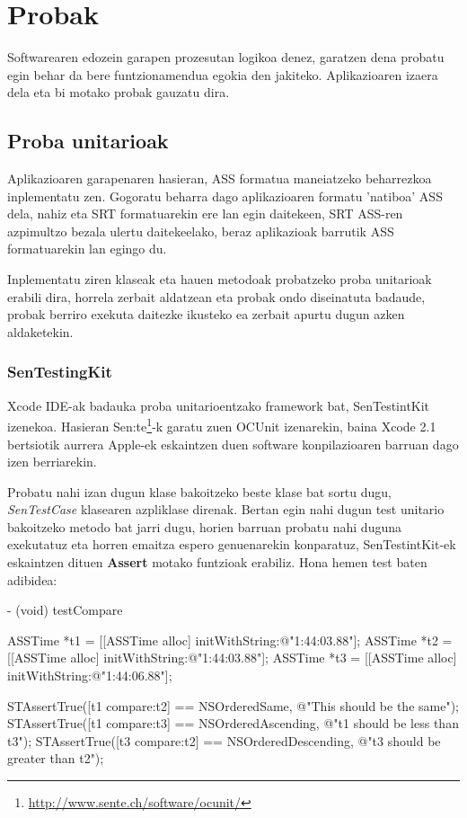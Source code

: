 \section{Probak}
Softwarearen edozein garapen prozesutan logikoa denez, garatzen dena probatu egin behar da bere funtzionamendua egokia den jakiteko. Aplikazioaren izaera dela eta bi motako probak gauzatu dira.

\subsection{Proba unitarioak}
Aplikazioaren garapenaren hasieran, ASS formatua maneiatzeko beharrezkoa inplementatu zen. Gogoratu beharra dago aplikazioaren formatu 'natiboa' ASS dela, nahiz eta SRT formatuarekin ere lan egin daitekeen, SRT ASS-ren azpimultzo bezala ulertu daitekeelako, beraz aplikazioak barrutik ASS formatuarekin lan egingo du.

Inplementatu ziren klaseak eta hauen metodoak probatzeko proba unitarioak erabili dira, horrela zerbait aldatzean eta probak ondo diseinatuta badaude, probak berriro exekuta daitezke ikusteko ea zerbait apurtu dugun azken aldaketekin.

\subsubsection{SenTestingKit}
Xcode IDE-ak badauka proba unitarioentzako framework bat, SenTestintKit izenekoa. Hasieran Sen:te\footnote{\url{http://www.sente.ch/software/ocunit/}}-k garatu zuen OCUnit izenarekin, baina Xcode 2.1 bertsiotik aurrera Apple-ek eskaintzen duen software konpilazioaren barruan dago izen berriarekin.

Probatu nahi izan dugun klase bakoitzeko beste klase bat sortu dugu, \textit{SenTestCase} klasearen azpliklase direnak. Bertan egin nahi dugun test unitario bakoitzeko metodo bat jarri dugu, horien barruan probatu nahi duguna exekutatuz eta horren emaitza espero genuenarekin konparatuz, SenTestintKit-ek eskaintzen dituen \textbf{Assert} motako funtzioak erabiliz. Hona hemen test baten adibidea:

\begin{verbatimtab}[8]
- (void) testCompare
{
	ASSTime *t1 = [[ASSTime alloc]
			initWithString:@"1:44:03.88"];
	ASSTime *t2 = [[ASSTime alloc]
			initWithString:@"1:44:03.88"];
	ASSTime *t3 = [[ASSTime alloc]
			initWithString:@"1:44:06.88"];
	
	STAssertTrue([t1 compare:t2] == NSOrderedSame,
			@"This should be the same");
	STAssertTrue([t1 compare:t3] == NSOrderedAscending,
			@"t1 should be less than t3");
	STAssertTrue([t3 compare:t2] == NSOrderedDescending,
			@"t3 should be greater than t2");
}
\end{verbatimtab}

